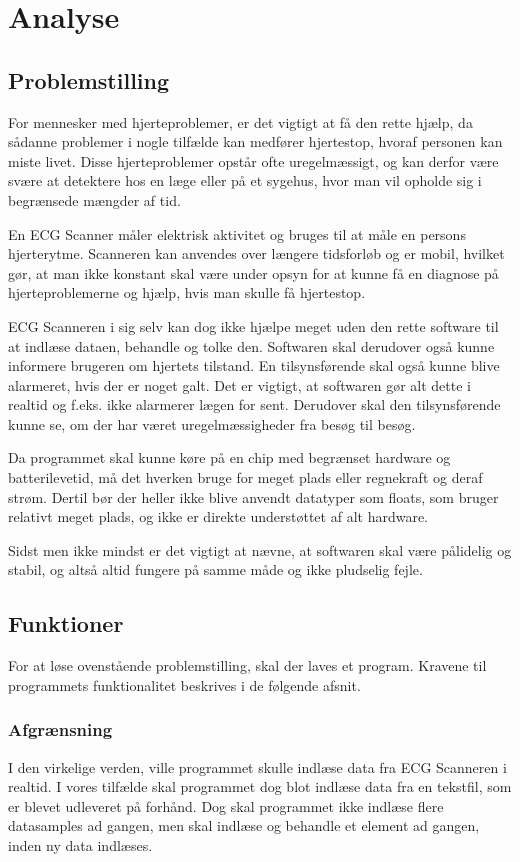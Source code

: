 \documentclass{article}
\begin{document}
\section{Analyse}
\subsection{Problemstilling}
For mennesker med hjerteproblemer, er det vigtigt at få den rette hjælp, da sådanne problemer i nogle tilfælde kan medfører hjertestop, hvoraf personen kan miste livet. Disse hjerteproblemer opstår ofte uregelmæssigt, og kan derfor være svære at detektere hos en læge eller på et sygehus, hvor man vil opholde sig i begrænsede mængder af tid.

En ECG Scanner måler elektrisk aktivitet og bruges til at måle en persons hjerterytme. Scanneren kan anvendes over længere tidsforløb og er mobil, hvilket gør, at man ikke konstant skal være under opsyn for at kunne få en diagnose på hjerteproblemerne og hjælp, hvis man skulle få hjertestop.

ECG Scanneren i sig selv kan dog ikke hjælpe meget uden den rette software til at indlæse dataen, behandle og tolke den. Softwaren skal derudover også kunne informere brugeren om hjertets tilstand. En tilsynsførende skal også kunne blive alarmeret, hvis der er noget galt. Det er vigtigt, at softwaren gør alt dette i realtid og f.eks. ikke alarmerer lægen for sent. Derudover skal den tilsynsførende kunne se, om der har været uregelmæssigheder fra besøg til besøg.

Da programmet skal kunne køre på en chip med begrænset hardware og batterilevetid, må det hverken bruge for meget plads eller regnekraft og deraf strøm. Dertil bør der heller ikke blive anvendt datatyper som floats, som bruger relativt meget plads, og ikke er direkte understøttet af alt hardware.

Sidst men ikke mindst er det vigtigt at nævne, at softwaren skal være pålidelig og stabil, og altså altid fungere på samme måde og ikke pludselig fejle.

\subsection{Funktioner}
For at løse ovenstående problemstilling, skal der laves et program. Kravene til programmets funktionalitet beskrives i de følgende afsnit.

\subsubsection{Afgrænsning}
I den virkelige verden, ville programmet skulle indlæse data fra ECG Scanneren i realtid. I vores tilfælde skal programmet dog blot indlæse data fra en tekstfil, som er blevet udleveret på forhånd. Dog skal programmet ikke indlæse flere datasamples ad gangen, men skal indlæse og behandle et element ad gangen, inden ny data indlæses.
\end{document}
